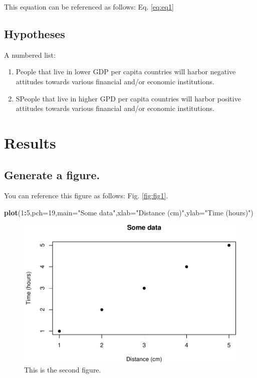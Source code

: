\documentclass[12pt,halfline,a4paper,]{ouparticle}
\newenvironment{Shaded}{\begin{snugshade}}{\end{snugshade}}
\newcommand{\DataTypeTok}[1]{\textcolor[rgb]{0.13,0.29,0.53}{#1}}
\newcommand{\DecValTok}[1]{\textcolor[rgb]{0.00,0.00,0.81}{#1}}
\newcommand{\KeywordTok}[1]{\textcolor[rgb]{0.13,0.29,0.53}{\textbf{#1}}}
\newcommand{\NormalTok}[1]{#1}
\newcommand{\OperatorTok}[1]{\textcolor[rgb]{0.81,0.36,0.00}{\textbf{#1}}}
\newcommand{\StringTok}[1]{\textcolor[rgb]{0.31,0.60,0.02}{#1}}
\providecommand{\tightlist}{%
  \setlength{\itemsep}{0pt}\setlength{\parskip}{0pt}}
\begin{document}
This equation can be referenced as follows: Eq. \ref{eq:eq1}

\hypertarget{hypotheses}{%
\subsection{Hypotheses}\label{hypotheses}}

A numbered list:

\begin{enumerate}
\def\labelenumi{\arabic{enumi})}
\tightlist
\item
  People that live in lower GDP per capita countries will harbor
  negative attitudes towards various financial and/or economic
  institutions.
\item
  SPeople that live in higher GPD per capita countries will harbor
  positive attitudes towards various financial and/or economic
  institutions.
\end{enumerate}

\hypertarget{results}{%
\section{Results}\label{results}}

\hypertarget{generate-a-figure.}{%
\subsection{Generate a figure.}\label{generate-a-figure.}}

You can reference this figure as follows: Fig. \ref{fig:fig1}.

\begin{Shaded}
\begin{Highlighting}[]
\KeywordTok{plot}\NormalTok{(}\DecValTok{1}\OperatorTok{:}\DecValTok{5}\NormalTok{,}\DataTypeTok{pch=}\DecValTok{19}\NormalTok{,}\DataTypeTok{main=}\StringTok{"Some data"}\NormalTok{,}\DataTypeTok{xlab=}\StringTok{"Distance (cm)"}\NormalTok{,}\DataTypeTok{ylab=}\StringTok{"Time (hours)"}\NormalTok{)}
\end{Highlighting}
\end{Shaded}

\begin{figure}[p]
\includegraphics[width=1\linewidth]{Markdown-v3.1_files/figure-latex/fig2-1} \caption{This is the second figure.}\label{fig:fig2}
\end{figure}
\end{document}
